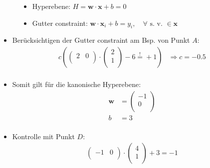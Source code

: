 \begin{frame}
\begin{figure}[h]
\begin{minipage}{0.4\textwidth}
{\begin{figure}[h]
{                    }
                \end{figure}
            }
        \end{minipage}
        \hfill
        \begin{minipage}{0.4\textwidth}
            \begin{itemize}
                \item<1-> Hyperebene: $ H = \boldsymbol{w} \cdot \boldsymbol{x} + b = 0 $
                \item<1-> Gutter constraint: $ \boldsymbol{w} \cdot \boldsymbol{x}_i + b = y_i, \quad \forall \text{ s. v. } \in \boldsymbol{x} $
            \end{itemize} 
        \end{minipage}
    \end{figure}

    \begin{itemize}
        \item<1-> Berücksichtigen der Gutter constraint am Bsp. von Punkt $A$:
            \begin{align*}
                c \left( \left( \begin{matrix}
                    2 & 0 \\
                \end{matrix} \right) \cdot \left( \begin{matrix}
                    2 \\
                    1 \\
                \end{matrix} \right) - 6 \overset{!}{=} +1 \right) &\Rightarrow c = -0.5 \\
            \end{align*}
        \item<2-> Somit gilt für die kanonische Hyperebene:
            \begin{align*}
                \boldsymbol{w} &= \left( \begin{matrix}
                    -1 \\
                    0 \\
                \end{matrix} \right) \\
                b &= 3 \\ 
            \end{align*}
        \item<3-> Kontrolle mit Punkt $D$:
            \begin{align*}
                \left( \begin{matrix}
                    -1 & 0 \\
                \end{matrix} \right) \cdot \left( \begin{matrix}
                    4 \\
                    1 \\
                \end{matrix} \right) + 3 = -1
            \end{align*}
    \end{itemize}
\end{frame}

